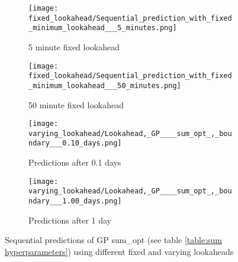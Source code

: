 \begin{figure}
    \centering
    \begin{subfigure}{0.45\textwidth}
        \centering
        \texttt{[image: fixed\_lookahead/Sequential\_prediction\_with\_fixed\_minimum\_lookahead\_\_\_5\_minutes.png]}
        \caption{5 minute fixed lookahead}
        \label{fig:5 min fixed lookahead}
    \end{subfigure}
    \begin{subfigure}{0.45\textwidth}
        \centering
        \texttt{[image: fixed\_lookahead/Sequential\_prediction\_with\_fixed\_minimum\_lookahead\_\_\_50\_minutes.png]}
        \caption{50 minute fixed lookahead}
        \label{fig:50 min fixed lookahead}
    \end{subfigure}
    \newline
    \begin{subfigure}{0.45\textwidth}
        \centering
        \texttt{[image: varying\_lookahead/Lookahead,\_GP\_\_\_\_sum\_opt\_,\_boundary\_\_\_0.10\_days.png]}
        \caption{Predictions after 0.1 days}
        \label{fig:0.1 day preds}
    \end{subfigure}
    \begin{subfigure}{0.45\textwidth}
        \centering
        \texttt{[image: varying\_lookahead/Lookahead,\_GP\_\_\_\_sum\_opt\_,\_boundary\_\_\_1.00\_days.png]}
        \caption{Predictions after 1 day}
        \label{fig:1 day preds}
    \end{subfigure}

    \caption{Sequential predictions of GP sum\_opt (see table \ref{table:sum hyperparameters}) using different fixed and varying lookaheads}
    \label{fig:sequential}
\end{figure}
